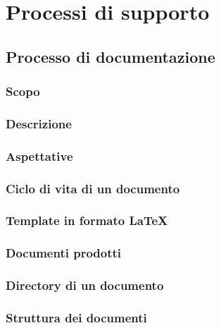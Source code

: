 \section{Processi di supporto}


\subsection{Processo di documentazione}

\subsubsection{Scopo}

\subsubsection{Descrizione}

\subsubsection{Aspettative}

\subsubsection{Ciclo di vita di un documento}

\subsubsection{Template in formato \LaTeX}

\subsubsection{Documenti prodotti}

\subsubsection{Directory di un documento}

\subsubsection{Struttura dei documenti}

